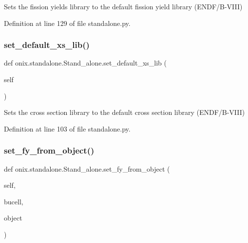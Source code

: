 \begin{DoxyVerb}Sets the fission yields library to the default fission yield library (ENDF/B-VIII)\end{DoxyVerb}
 

Definition at line 129 of file standalone.\+py.

\mbox{\label{classonix_1_1standalone_1_1Stand__alone_a6e5aec4da43990b0736cafa49ae67d8d}} 
\subsubsection{\texorpdfstring{set\+\_\+default\+\_\+xs\+\_\+lib()}{set\_default\_xs\_lib()}}
{\footnotesize\ttfamily def onix.\+standalone.\+Stand\+\_\+alone.\+set\+\_\+default\+\_\+xs\+\_\+lib (\begin{DoxyParamCaption}\item[{}]{self }\end{DoxyParamCaption})}

\begin{DoxyVerb}Sets the cross section library to the default cross section library (ENDF/B-VIII)\end{DoxyVerb}
 

Definition at line 103 of file standalone.\+py.

\mbox{\label{classonix_1_1standalone_1_1Stand__alone_a01d727d32b9a64f1b7ded3f2e7e4c833}} 
\subsubsection{\texorpdfstring{set\+\_\+fy\+\_\+from\+\_\+object()}{set\_fy\_from\_object()}}
{\footnotesize\ttfamily def onix.\+standalone.\+Stand\+\_\+alone.\+set\+\_\+fy\+\_\+from\+\_\+object (\begin{DoxyParamCaption}\item[{}]{self,  }\item[{}]{bucell,  }\item[{}]{object }\end{DoxyParamCaption})}

